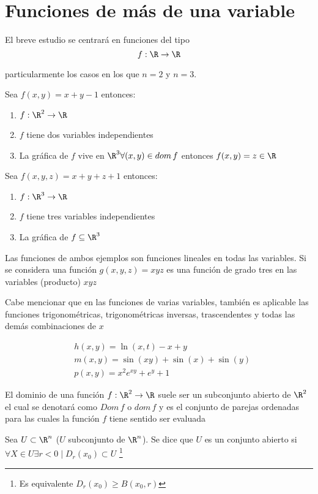 \section{Funciones de más de una variable}

El breve estudio se centrará en funciones del tipo
\begin{equation*}
	f:\R\to \R
\end{equation*}

particularmente los casos en los que $n=2$ y $n=3$.

\begin{example}
	Sea $f(x,y)=x+y-1$ entonces:
	\begin{enumerate}
		\item $f:\R^2\to \R$
		\item $f$ tiene dos variables independientes
		\item La gráfica de $f$ vive en $\R^3\forall (x,y)\in dom\, f$ entonces $f(x,y)=z\in\R$
	\end{enumerate}
\end{example}

\begin{example}
	Sea $f(x,y,z)=x+y+z+1$ entonces:
	\begin{enumerate}
		\item $f:\R^3\to \R$
		\item $f$ tiene tres variables independientes
		\item La gráfica de $f\subseteq\R^3$
	\end{enumerate}
\end{example}

Las funciones de ambos ejemplos son funciones lineales en todas las variables.
Si se considera una función $g(x,y,z)=xyz$ es una función de grado tres en las variables (producto) $xyz$

Cabe mencionar que en las funciones de varias variables, también es aplicable las funciones trigonométricas,
trigonométricas inversas, trascendentes y todas las demás combinaciones de $x$

\begin{align*}
	 & h(x,y)=\ln{(x,t)}-x+y                 \\
	 & m(x,y)=\sin{(xy)}+\sin{(x)}+\sin{(y)} \\
	 & p(x,y)=x^2e^{xy}+e^y+1
\end{align*}

El dominio de una función $f:\R^2\to\R$ suele ser un subconjunto abierto de $\R^2$
el cual se denotará como $Dom\, f$ o $dom\, f$ y es el conjunto de parejas ordenadas para las cuales la función
$f$ tiene sentido ser evaluada
\newpage
\begin{definition}
	Sea $U\subset \R^n$ ($U$ subconjunto de $\R^n$). Se dice que $U$ es un conjunto abierto si $\forall X\in U\exists r<0\mid D_r(x_0)\subset U$ \footnote{Es equivalente $D_r(x_0)\geq B(x_0,r)$}
\end{definition}


